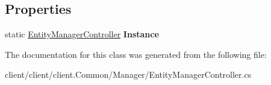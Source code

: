 \subsection*{Properties}
\begin{DoxyCompactItemize}
\item 
\hypertarget{classClient_1_1Common_1_1Manager_1_1EntityManagerController_ad3bded5714962f5182c966472f7e41d1}{static \hyperlink{classClient_1_1Common_1_1Manager_1_1EntityManagerController}{Entity\-Manager\-Controller} {\bfseries Instance}}\label{classClient_1_1Common_1_1Manager_1_1EntityManagerController_ad3bded5714962f5182c966472f7e41d1}

\end{DoxyCompactItemize}


The documentation for this class was generated from the following file\-:\begin{DoxyCompactItemize}
\item 
client/client/client.\-Common/\-Manager/Entity\-Manager\-Controller.\-cs\end{DoxyCompactItemize}

